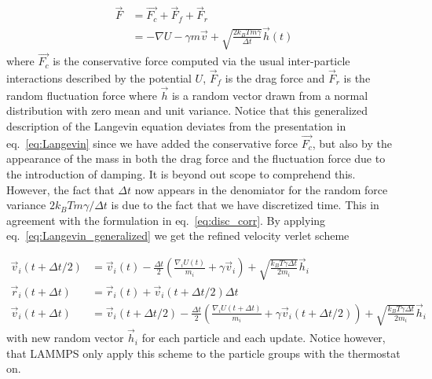 \begin{align}
  \vec{F} &= \vec{F_c} + \vec{F}_{f} + \vec{F}_{r} \nonumber \\
  &= -\nabla U - \gamma m \vec{v} + \sqrt{\frac{2 k_B T m \gamma}{\Delta t}}\vec{h}(t)
  \label{eq:Langevin_generalized}
\end{align}
where $\vec{F_c}$ is the conservative force computed via the usual
inter-particle interactions described by the potential $U$, $\vec{F}_f$ is the
drag force and $\vec{F}_r$ is the random fluctuation force where $\vec{h}$ is a
random vector drawn from a normal distribution with zero mean and unit variance.
Notice that this generalized description of the Langevin equation deviates from
the presentation in eq.~\eqref{eq:Langevin} since we have added the conservative
force $\vec{F_c}$, but also by the appearance of the mass in both the drag force
and the fluctuation force due to the introduction of damping. It is beyond out
scope to comprehend this. However, the fact that $\Delta t$ now appears in the
denomiator for the random force variance $2k_B T m \gamma / \Delta t$ is due to
the fact that we have discretized time. This in agreement with the formulation
in eq.~\eqref{eq:disc_corr}. By applying eq.~\eqref{eq:Langevin_generalized} we
get the refined velocity verlet scheme


\begin{align*}
  \vec{v}_i(t + \Delta t/2)  &= \vec{v}_i(t) - \frac{\Delta t}{2}\left(\frac{\nabla_i U(t)}{m_i} + \gamma \vec{v}_i \right) + \sqrt{\frac{k_B T \gamma \Delta t}{2m_i}} \vec{h}_i \\ 
  \vec{r}_i(t + \Delta t) &= \vec{r}_i(t) + \vec{v}_i(t + \Delta t/2) \Delta t \\
  \vec{v}_i(t + \Delta t) &= \vec{v}_i(t+ \Delta t/2) - \frac{\Delta t}{2}\left(\frac{\nabla_i U(t + \Delta t)}{m_i} + \gamma \vec{v}_i(t + \Delta t/2) \right) + \sqrt{\frac{k_B T \gamma \Delta t}{2m_i}} \vec{h}_i
\end{align*}
with new random vector $\vec{h}_i$ for each particle and each update. Notice
however, that LAMMPS only apply this scheme to the particle groups with the
thermostat on. 



